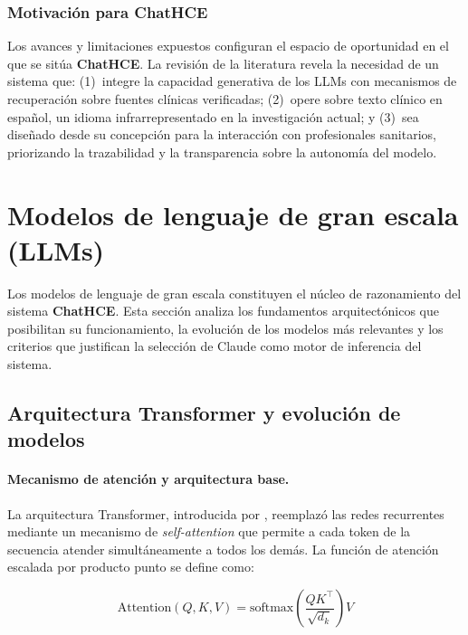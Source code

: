 \subsubsection*{Motivación para ChatHCE}

Los avances y limitaciones expuestos configuran el espacio de oportunidad en el que se sitúa \textbf{ChatHCE}. La revisión de la literatura revela la necesidad de un sistema que: (1)~integre la capacidad generativa de los \ac{LLM}s con mecanismos de recuperación sobre fuentes clínicas verificadas; (2)~opere sobre texto clínico en español, un idioma infrarrepresentado en la investigación actual; y (3)~sea diseñado desde su concepción para la interacción con profesionales sanitarios, priorizando la trazabilidad y la transparencia sobre la autonomía del modelo.

\section{Modelos de lenguaje de gran escala (\acs{LLM}s)}
\label{sec:llms}

Los modelos de lenguaje de gran escala constituyen el núcleo de razonamiento del sistema \textbf{ChatHCE}. Esta sección analiza los fundamentos arquitectónicos que posibilitan su funcionamiento, la evolución de los modelos más relevantes y los criterios que justifican la selección de Claude como motor de inferencia del sistema.

\subsection{Arquitectura Transformer y evolución de modelos}
\label{subsec:llms-transformer}

\paragraph{Mecanismo de atención y arquitectura base.}

La arquitectura Transformer, introducida por \textcite{vaswani2017attention}, reemplazó las redes recurrentes mediante un mecanismo de \textit{self-attention} que permite a cada token de la secuencia atender simultáneamente a todos los demás. La función de atención escalada por producto punto se define como:

\begin{equation}
\text{Attention}(Q, K, V) = \text{softmax}\!\left(\frac{QK^\top}{\sqrt{d_k}}\right)V
\label{eq:attention}
\end{equation}


